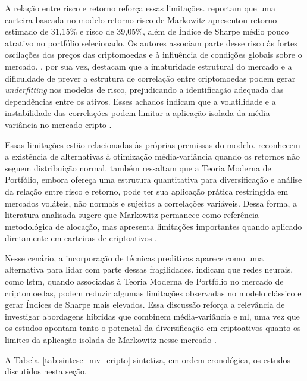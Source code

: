 A relação entre risco e retorno reforça essas limitações.  reportam que uma carteira baseada no modelo retorno-risco de Markowitz apresentou retorno estimado de 31,15\% e risco de 39,05\%, além de Índice de Sharpe médio pouco atrativo no portfólio selecionado. Os autores associam parte desse risco às fortes oscilações dos preços das criptomoedas e à influência de condições globais sobre o mercado. , por sua vez, destacam que a imaturidade estrutural do mercado e a dificuldade de prever a estrutura de correlação entre criptomoedas podem gerar \textit{underfitting} nos modelos de risco, prejudicando a identificação adequada das dependências entre os ativos. Esses achados indicam que a volatilidade e a instabilidade das correlações podem limitar a aplicação isolada da média-variância no mercado cripto \cite{jeleskovic2024cryptocurrency,zouaoui2025portfolio}.

Essas limitações estão relacionadas às próprias premissas do modelo.  reconhecem a existência de alternativas à otimização média-variância quando os retornos não seguem distribuição normal.  também ressaltam que a Teoria Moderna de Portfólio, embora ofereça uma estrutura quantitativa para diversificação e análise da relação entre risco e retorno, pode ter sua aplicação prática restringida em mercados voláteis, não normais e sujeitos a correlações variáveis. Dessa forma, a literatura analisada sugere que Markowitz permanece como referência metodológica de alocação, mas apresenta limitações importantes quando aplicado diretamente em carteiras de criptoativos \cite{brauneis2019cryptocurrency,zouaoui2025portfolio}.

Nesse cenário, a incorporação de técnicas preditivas aparece como uma alternativa para lidar com parte dessas fragilidades.  indicam que redes neurais, como \acs{lstm}, quando associadas à Teoria Moderna de Portfólio no mercado de criptomoedas, podem reduzir algumas limitações observadas no modelo clássico e gerar Índices de Sharpe mais elevados. Essa discussão reforça a relevância de investigar abordagens híbridas que combinem média-variância e \acl{ml}, uma vez que os estudos apontam tanto o potencial da diversificação em criptoativos quanto os limites da aplicação isolada de Markowitz nesse mercado \cite{brauneis2019cryptocurrency,jeleskovic2024cryptocurrency,zouaoui2025portfolio}.

A Tabela~\ref{tab:sintese_mv_cripto} sintetiza, em ordem cronológica, os estudos discutidos nesta seção.


